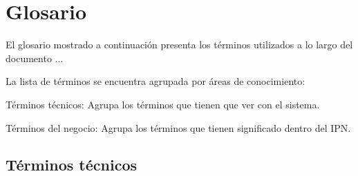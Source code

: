 \chapter{Glosario}
\label{ch:glosario}


	El glosario mostrado a continuación presenta los términos utilizados a lo largo del documento ... 
	
    \noindent La lista de términos se encuentra agrupada por áreas de conocimiento:

	\begin{Citemize}
		\item Términos técnicos: Agrupa los términos que tienen que ver con el sistema.
		\item Términos del negocio: Agrupa los términos que tienen significado dentro del IPN.
	\end{Citemize}

\section{Términos técnicos}
\label{gls:terminosTecnicos}


